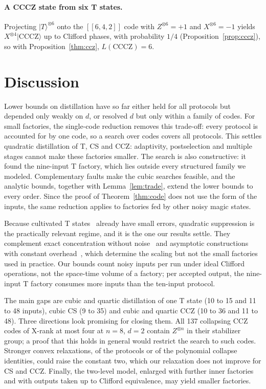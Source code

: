 \documentclass[aps,prl,reprint,twocolumn,amsmath,amssymb,floatfix,nofootinbib,superscriptaddress]{revtex4-2}
\newcommand{\CCCZ}{\mathrm{CCCZ}}
\newcommand{\QuarticUB}{48}
\begin{document}
\paragraph*{A CCCZ state from six T states.}
Projecting $|T\rangle^{\otimes6}$ onto the $[[6,4,2]]$ code with $Z^{\otimes6}=+1$ and $X^{\otimes6}=-1$ yields $X^{\otimes4}|\CCCZ\rangle$ up to Clifford phases, with probability $1/4$ (Proposition~\ref{prop:cccz}), so with Proposition~\ref{thm:ccz}, $L(\CCCZ)=6$.

%
\section{Discussion}
Lower bounds on distillation have so far either held for all protocols but depended only weakly on $d$, or resolved $d$ but only within a family of codes. For small factories, the single-code reduction removes this trade-off: every protocol is accounted for by one code, so a search over codes covers all protocols. This settles quadratic distillation of T, CS and CCZ: adaptivity, postselection and multiple stages cannot make these factories smaller. The search is also constructive: it found the nine-input T factory, which lies outside every structured family we modeled. Complementary faults make the cubic searches feasible, and the analytic bounds, together with Lemma~\ref{lem:trade}, extend the lower bounds to every order. Since the proof of Theorem~\ref{thm:code} does not use the form of the inputs, the same reduction applies to factories fed by other noisy magic states.

Because cultivated T states~\cite{cultivation,googlecultivation} already have small errors, quadratic suppression is the practically relevant regime, and it is the one our results settle. They complement exact concentration without noise~\cite{rizzoleone} and asymptotic constructions with constant overhead~\cite{whyamasaki,golowich,nguyen}, which determine the scaling but not the small factories used in practice. Our bounds count noisy inputs per run under ideal Clifford operations, not the space-time volume of a factory; per accepted output, the nine-input T factory consumes more inputs than the ten-input protocol.

The main gaps are cubic and quartic distillation of one T state (10 to 15 and 11 to 48 inputs), cubic CS (9 to 35) and cubic and quartic CCZ (10 to 36 and 11 to \QuarticUB). Three directions look promising for closing them. All 137 collapsing CCZ codes of X-rank at most four at $n=8$, $d=2$ contain $Z^{\otimes n}$ in their stabilizer group; a proof that this holds in general would restrict the search to such codes. Stronger convex relaxations, of the protocols or of the polynomial collapse identities, could raise the constant two, which our relaxation does not improve for CS and CCZ. Finally, the two-level model, enlarged with further inner factories and with outputs taken up to Clifford equivalence, may yield smaller factories.
\end{document}
